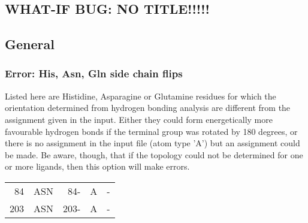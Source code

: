 \documentclass[a4paper]{article}
\def\showsect#1{
  \thesect\gdef\thesect{}
  \thessect\gdef\thessect{}
  \subsubsection{#1}
}
\gdef\thesect{\pagebreak[2]\section{WHAT-IF BUG: NO TITLE!!!!!}}
\gdef\thessect{\subsection{General}}
\begin{document}
\begin{error}
\showsect{Error: His, Asn, Gln side chain flips}
Listed here are Histidine, Asparagine or Glutamine residues for
which the orientation determined from hydrogen bonding analysis are
different from the assignment given in the input. Either they could
form energetically more favourable hydrogen bonds if the terminal
group was rotated by 180 degrees, or there is no assignment in the
input file (atom type 'A') but an assignment could be made. Be aware,
though, that if the topology could not be determined for one or more
ligands, then this option will make errors.
 
\begin{center}
 
\begin{supertabular}{rr@{ (}r@{) }rl}
   84&ASN &  84-&A &-\\
  203&ASN & 203-&A &-\\
\end{supertabular}\end{center}
\end{error}
\end{document}

